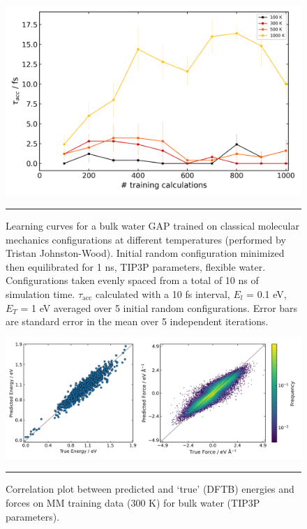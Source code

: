 \documentclass[../../main.tex]{subfiles}
\newcommand{\taua}{$\tau_\text{acc}$ }
\begin{document}
\begin{figure}[h!]
	\vspace{0.4cm}
	\centering
	\includegraphics[width=12cm]{6/gap/figs_si/fig5}
	\vspace{0.2cm}
	\hrule
	\caption{Learning curves for a bulk water GAP trained on classical molecular mechanics configurations at different temperatures (performed by Tristan Johnston-Wood). Initial random configuration minimized then equilibrated for 1 ns, TIP3P parameters, flexible water. Configurations taken evenly spaced from a total of 10 ns of simulation time. \taua calculated with a 10 fs interval, $E_l$ = 0.1 eV, $E_T$ = 1 eV averaged over 5 initial random configurations. Error bars are standard error in the mean over 5 independent iterations.}
	\label{fig::ml_si_5}
\end{figure}



\begin{figure}[h!]
	\vspace{0.4cm}
	\centering
	\includegraphics[width=\textwidth]{6/gap/figs_si/fig6}
	\vspace{0.2cm}
	\hrule
	\caption{Correlation plot between predicted and ‘true’ (DFTB) energies and forces on MM training data (300 K) for bulk water (TIP3P parameters).}
	\label{fig::ml_si_6}
\end{figure}
\end{document}
